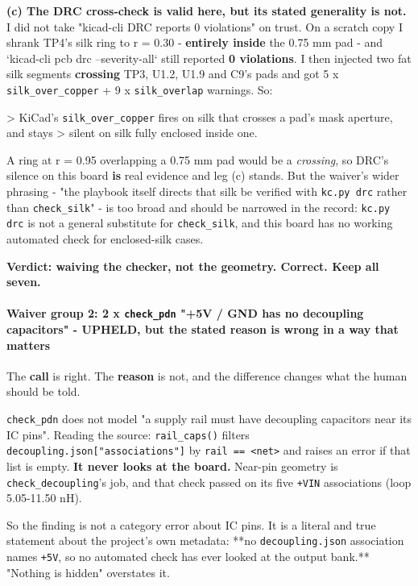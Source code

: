 \documentclass[11pt,a4paper]{article}
\begin{document}
\textbf{(c) The DRC cross-check is valid here, but its stated generality is not.} I did not take "kicad-cli DRC reports 0 violations" on trust. On a scratch copy I shrank TP4's silk ring to r = 0.30 - \textbf{entirely inside} the 0.75 mm pad - and `kicad-cli pcb drc --severity-all` still reported \textbf{0 violations}. I then injected two fat silk segments \textbf{crossing} TP3, U1.2, U1.9 and C9's pads and got 5 x \texttt{silk\_over\_copper} + 9 x \texttt{silk\_overlap} warnings. So:

\textgreater{} KiCad's \texttt{silk\_over\_copper} fires on silk that crosses a pad's mask aperture, and stays \textgreater{} silent on silk fully enclosed inside one.

A ring at r = 0.95 overlapping a 0.75 mm pad would be a \emph{crossing}, so DRC's silence on this board \textbf{is} real evidence and leg (c) stands. But the waiver's wider phrasing - "the playbook itself directs that silk be verified with \texttt{kc.py drc} rather than \texttt{check\_silk}" - is too broad and should be narrowed in the record: \texttt{kc.py drc} is not a general substitute for \texttt{check\_silk}, and this board has no working automated check for enclosed-silk cases.

\textbf{Verdict: waiving the checker, not the geometry. Correct. Keep all seven.}

\paragraph*{Waiver group 2: 2 x \texttt{check\_pdn} "+5V / GND has no decoupling capacitors" - \textbf{UPHELD, but the stated reason is wrong in a way that matters}}
The \textbf{call} is right. The \textbf{reason} is not, and the difference changes what the human should be told.

\texttt{check\_pdn} does not model "a supply rail must have decoupling capacitors near its IC pins". Reading the source: \texttt{rail\_caps()} filters \texttt{decoupling.json{[}"associations"{]}} by \texttt{rail == \textless{}net\textgreater{}} and raises an error if that list is empty. \textbf{It never looks at the board.} Near-pin geometry is \texttt{check\_decoupling}'s job, and that check passed on its five \texttt{+VIN} associations (loop 5.05-11.50 nH).

So the finding is not a category error about IC pins. It is a literal and true statement about the project's own metadata: {*}{*}no \texttt{decoupling.json} association names \texttt{+5V}, so no automated check has ever looked at the output bank.{*}{*} "Nothing is hidden" overstates it.
\end{document}
